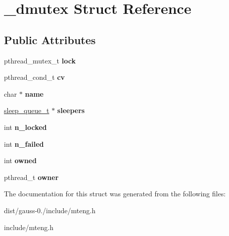 \hypertarget{struct__dmutex}{\section{\-\_\-dmutex Struct Reference}
\label{struct__dmutex}
}
\subsection*{Public Attributes}
\begin{DoxyCompactItemize}
\item 
\hypertarget{struct__dmutex_a8be42defa804d6c83175bb75837d0a9c}{pthread\-\_\-mutex\-\_\-t {\bfseries lock}}\label{struct__dmutex_a8be42defa804d6c83175bb75837d0a9c}

\item 
\hypertarget{struct__dmutex_a55a3aacf2282785382872979553a810e}{pthread\-\_\-cond\-\_\-t {\bfseries cv}}\label{struct__dmutex_a55a3aacf2282785382872979553a810e}

\item 
\hypertarget{struct__dmutex_ac0e378051def8e0f874edeb2259bfdd1}{char $\ast$ {\bfseries name}}\label{struct__dmutex_ac0e378051def8e0f874edeb2259bfdd1}

\item 
\hypertarget{struct__dmutex_ad250e036e59a7dc5471802a8c72365f4}{\hyperlink{struct__sleep__queue__t}{sleep\-\_\-queue\-\_\-t} $\ast$ {\bfseries sleepers}}\label{struct__dmutex_ad250e036e59a7dc5471802a8c72365f4}

\item 
\hypertarget{struct__dmutex_a14c8b211692274b9417f0e364e2830e6}{int {\bfseries n\-\_\-locked}}\label{struct__dmutex_a14c8b211692274b9417f0e364e2830e6}

\item 
\hypertarget{struct__dmutex_a863a5f0f0c4aa0c548cf240c3f3cc2ec}{int {\bfseries n\-\_\-failed}}\label{struct__dmutex_a863a5f0f0c4aa0c548cf240c3f3cc2ec}

\item 
\hypertarget{struct__dmutex_aa9a8d097b96b362a9367c39d2a9d1ba3}{int {\bfseries owned}}\label{struct__dmutex_aa9a8d097b96b362a9367c39d2a9d1ba3}

\item 
\hypertarget{struct__dmutex_a1b8018a8c7e484358aa0cb0431763dc8}{pthread\-\_\-t {\bfseries owner}}\label{struct__dmutex_a1b8018a8c7e484358aa0cb0431763dc8}

\end{DoxyCompactItemize}


The documentation for this struct was generated from the following files\-:\begin{DoxyCompactItemize}
\item 
dist/gauss-\/0./include/mteng.\-h\item 
include/mteng.\-h\end{DoxyCompactItemize}
